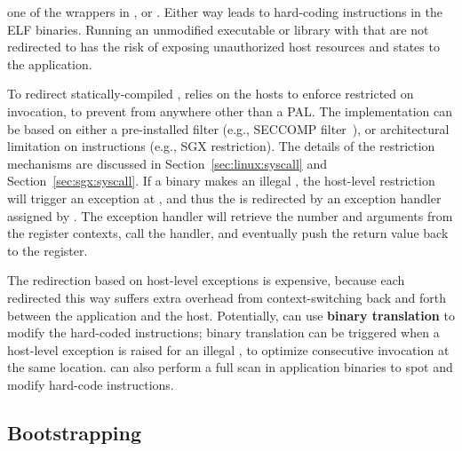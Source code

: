 one of the \linuxapi{} wrappers in \libc{}, or .
Either way leads to hard-coding  instructions in the ELF binaries.
Running an unmodified executable or library
with \linuxapis{} that are not redirected to \thelibos{}
has the risk of exposing
unauthorized host resources and states
to the application.


To redirect statically-compiled \linuxapis{}, \thelibos{} relies on the hosts to enforce restricted on
\linuxapi{} invocation,
to prevent \linuxapis{} from anywhere other than a PAL.
The implementation can be based on either a pre-installed \linuxapi{} filter
(e.g., SECCOMP filter~\cite{seccomp}),
or architectural limitation on  instructions
(e.g., SGX restriction).
The details of the \linuxapi{} restriction mechanisms are discussed in
Section~\ref{sec:linux:syscall} and Section~\ref{sec:sgx:syscall}.
If a binary makes an illegal \linuxapi{},
the host-level \linuxapi{} restriction will trigger an  exception
at \thehostabi{},
and thus the \linuxapi{} is redirected by an exception handler
assigned by \thelibos{}.
The exception handler will retrieve the \linuxapi{} number and arguments
from the register contexts,
call the \linuxapi{} handler,
and eventually push the \linuxapi{} return value back to the  register.


The \linuxapi{} redirection based on
host-level exceptions
is expensive, because each \linuxapi{} redirected this way
suffers extra overhead
from context-switching back and forth between the application and the host.
Potentially,
\thelibos{} can use {\bf binary translation} to modify the hard-coded  instructions;
binary translation
can be triggered when a host-level exception is raised
for an illegal \linuxapi{},
to optimize consecutive \linuxapi{} invocation at the same location.
\thelibos{} can also perform a full scan in application binaries
to spot and modify hard-code  instructions.









\subsection{Bootstrapping}


\thelibos{}



